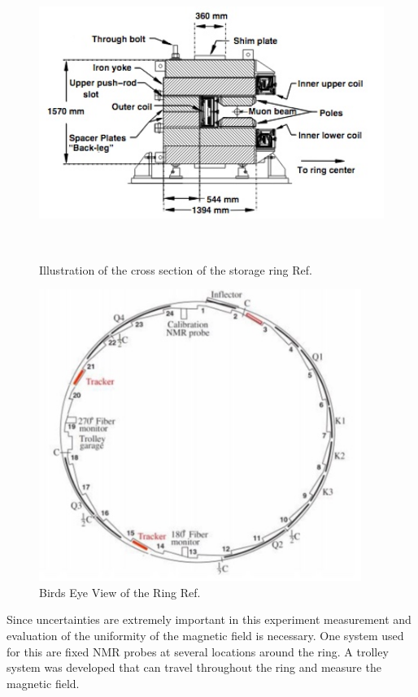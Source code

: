 \documentclass[./Thesis]{subfiles}
\begin{document}
\begin{figure}
\centerline{\includegraphics[height=95mm]{RingCrossSection.jpeg}}
\caption[Storage Ring Cross Section]{ Illustration of the cross section of the storage ring  Ref. \cite{TDR}
	}
\label{fig:SRCrossSection}
\end{figure}	
	

\begin{figure}
\centerline{\includegraphics[height=95mm]{RingBirdsEye.jpeg}}
\caption[Birds Eye View of Ring]{ Birds Eye View of the Ring Ref. \cite{TDR}
	}
\label{fig:RingBirdsEye}
\end{figure}	



	Since uncertainties are extremely important in this experiment measurement and evaluation of the uniformity of the magnetic field is necessary. One system used for this are fixed NMR probes at several locations around the ring. A trolley system was developed that can travel throughout the ring and measure the magnetic field. 
\end{document}
